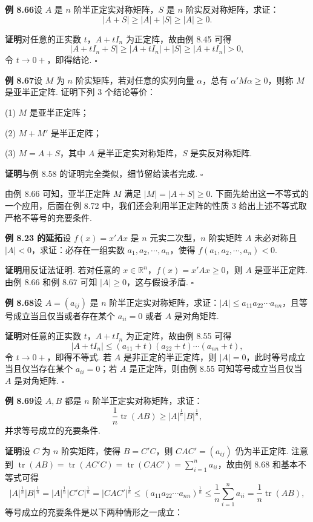 \documentclass[UTF8, 12pt, fontset=fandol, oneside]{ctexart}
\begin{document}
\noindent\textbf{例 8.66}\quad 设 $A$ 是 $n$ 阶半正定实对称矩阵，$S$ 是 $n$ 阶实反对称矩阵，求证：
\[
|A+S|\ge |A|+|S|\ge |A|\ge 0.
\]

\noindent\textbf{证明}\quad 对任意的正实数 $t$，$A+tI_n$ 为正定阵，故由例 8.45 可得
\[
|A+tI_n+S|\ge |A+tI_n|+|S|\ge |A+tI_n|>0,
\]
令 $t\to 0+$，即得结论. $\ensuremath{\square}$

\noindent\textbf{例 8.67}\quad 设 $M$ 为 $n$ 阶实矩阵，若对任意的实列向量 $\alpha$，总有 $\alpha'M\alpha\ge 0$，则称 $M$ 是亚半正定阵. 证明下列 3 个结论等价：

(1) $M$ 是亚半正定阵；

(2) $M+M'$ 是半正定阵；

(3) $M=A+S$，其中 $A$ 是半正定实对称矩阵，$S$ 是实反对称矩阵.

\noindent\textbf{证明}\quad 与例 8.58 的证明完全类似，细节留给读者完成. $\ensuremath{\square}$

由例 8.66 可知，亚半正定阵 $M$ 满足 $|M|=|A+S|\ge 0$. 下面先给出这一不等式的一个应用，后面在例 8.72 中，我们还会利用半正定阵的性质 3 给出上述不等式取严格不等号的充要条件.

\noindent\textbf{例 8.23 的延拓}\quad 设 $f(x)=x'Ax$ 是 $n$ 元实二次型，$n$ 阶实矩阵 $A$ 未必对称且 $|A|<0$，求证：必存在一组实数 $a_1,a_2,\cdots,a_n$，使得 $f(a_1,a_2,\cdots,a_n)<0$.

\noindent\textbf{证明}\quad 用反证法证明. 若对任意的 $x\in\mathbb{R}^n$，$f(x)=x'Ax\ge 0$，则 $A$ 是亚半正定阵. 由例 8.66 和例 8.67 可知 $|A|\ge 0$，这与假设矛盾. $\ensuremath{\square}$

\noindent\textbf{例 8.68}\quad 设 $A=(a_{ij})$ 是 $n$ 阶半正定实对称矩阵，求证：$|A|\le a_{11}a_{22}\cdots a_{nn}$，且等号成立当且仅当或者存在某个 $a_{ii}=0$ 或者 $A$ 是对角矩阵.

\noindent\textbf{证明}\quad 对任意的正实数 $t$，$A+tI_n$ 为正定阵，故由例 8.55 可得
\[
|A+tI_n|\le (a_{11}+t)(a_{22}+t)\cdots(a_{nn}+t),
\]
令 $t\to 0+$，即得不等式. 若 $A$ 是非正定的半正定阵，则 $|A|=0$，此时等号成立当且仅当存在某个 $a_{ii}=0$；若 $A$ 是正定阵，则由例 8.55 可知等号成立当且仅当 $A$ 是对角矩阵. $\ensuremath{\square}$

\noindent\textbf{例 8.69}\quad 设 $A,B$ 都是 $n$ 阶半正定实对称矩阵，求证：
\[
\frac1n\operatorname{tr}(AB)\ge |A|^{\frac1n}|B|^{\frac1n},
\]
并求等号成立的充要条件.

\noindent\textbf{证明}\quad 设 $C$ 为 $n$ 阶实矩阵，使得 $B=C'C$，则 $CAC'=(a_{ij})$ 仍为半正定阵. 注意到 $\operatorname{tr}(AB)=\operatorname{tr}(AC'C)=\operatorname{tr}(CAC')=\sum_{i=1}^n a_{ii}$，故由例 8.68 和基本不等式可得
\[
|A|^{\frac1n}|B|^{\frac1n}=|A|^{\frac1n}|C'C|^{\frac1n}
=|CAC'|^{\frac1n}\le (a_{11}a_{22}\cdots a_{nn})^{\frac1n}
\le \frac1n\sum_{i=1}^n a_{ii}=\frac1n\operatorname{tr}(AB),
\]
等号成立的充要条件是以下两种情形之一成立：
\end{document}
